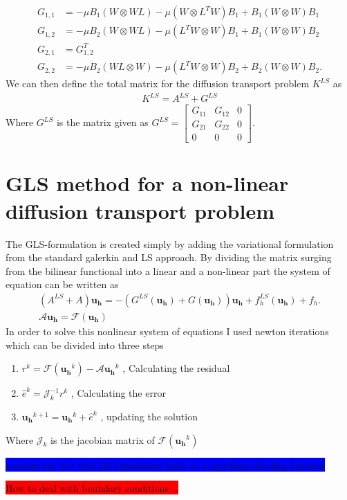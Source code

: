 \begin{align}
	G_{1,1} &= -\mu B_1 (W \otimes WL) -\mu( W \otimes L^TW) B_1 + B_1( W\otimes W) B_1 \\ 	
	G_{1,2} &= -\mu B_2 (W \otimes WL) -\mu (L^TW \otimes W) B_1 + B_1 (W\otimes W) B_2 \\
	G_{2,1} &= G_{1,2}^T \\
	G_{2,2} &= -\mu B_2 (WL \otimes W) -\mu (L^TW \otimes W) B_2 + B_2 (W\otimes W) B_2. 
	\label{eq:additionalMatrixDiffTrans}
\end{align}
%
We can then define the total matrix for the diffusion transport problem $K^{LS}$ as
\begin{align}
K^{LS} = A^{LS} + G^{LS}
	\label{eq:difftransMatrixSum}
\end{align}
Where $G^{LS}$ is the matrix given as 
$
G^{LS}=
\begin{bmatrix}
	G_{11} & G_{12} &0 \\
	G_{21} & G_{22} &0 \\
	0 & 0 & 0 
\end{bmatrix}.
$
%
\section{GLS method for a non-linear diffusion transport problem}
The GLS-formulation is created simply by adding the variational formulation from the standard galerkin and LS approach. By dividing the matrix surging from the bilinear functional into a linear and a non-linear part the system of equation can be written as 
%
\begin{align}
	(A^{LS}+A)\mathbf{u_h} = -(G^{LS}(\mathbf{u_h})+G(\mathbf{u_h}))\mathbf{u_h} + f_h^{LS}(\mathbf{u_h})+f_h. \\
	\mathcal{A} \mathbf{u_h} = \mathcal{F} (\mathbf{u_h})
	\label{eq:nonlinMatrixFormulation}
\end{align}
%
In order to solve this nonlinear system of equations I used newton iterations which can be divided into three steps 
%
\begin{enumerate}
	\item $r^k = \mathcal{ F } (\mathbf{u_h}^k) - \mathcal{A}\mathbf{u_h}^k$   , Calculating the residual
	\item $\hat{e}^k = \mathcal{J}_k^{-1}r^k $  , Calculating the error 
	\item $\mathbf{u_h}^{k+1}=\mathbf{u_h}^k+\hat{e}^k$    , updating the solution
\end{enumerate}
%
Where $\mathcal{J}_k$ is the jacobian matrix of $\mathcal{F}(\mathbf{u_h}^k)$

\colorbox{blue}{mention the fact that LS formulation leads to a non-linear loading function}

\colorbox{red}{How to deal with boundary conditions \ldots }
